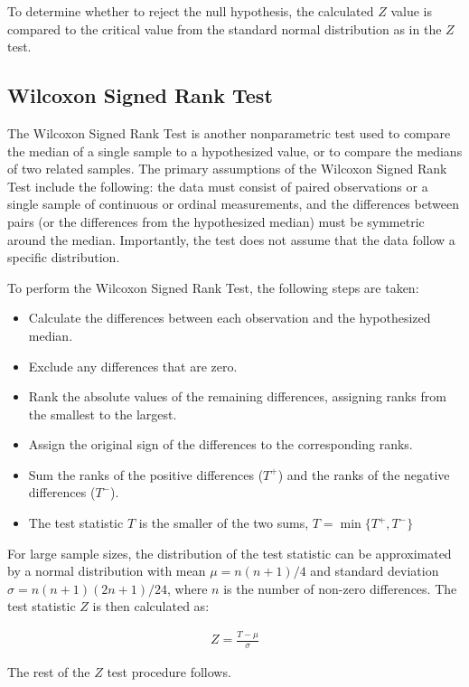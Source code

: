 \documentclass{article}
\begin{document}
To determine whether to reject the null hypothesis, the calculated $Z$ value is compared to the critical value from the standard normal distribution as in the $Z$ test. 

\subsection{Wilcoxon Signed Rank Test}

The Wilcoxon Signed Rank Test is another nonparametric  test used to compare the median of a single sample to a hypothesized value, or to compare the medians of two related samples. The primary assumptions of the Wilcoxon Signed Rank Test include the following: the data must consist of paired observations or a single sample of continuous or ordinal measurements, and the differences between pairs (or the differences from the hypothesized median) must be symmetric around the median. Importantly, the test does not assume that the data follow a specific distribution.

To perform the Wilcoxon Signed Rank Test, the following steps are taken:

\begin{itemize}
\item Calculate the differences between each observation and the hypothesized median.
\item Exclude any differences that are zero.
\item Rank the absolute values of the remaining differences, assigning ranks from the smallest to the largest.
\item Assign the original sign of the differences to the corresponding ranks.
\item Sum the ranks of the positive differences ($T^{+}$) and the ranks of the negative differences ($T^{-}$).
\item The test statistic $T$ is the smaller of the two sums, $T = \min\{T^{+}, T^{-}\}$
\end{itemize}

For large sample sizes, the distribution of the test statistic can be approximated by a normal distribution with mean $\mu = n(n+1)/4$ and standard deviation $\sigma = n(n+1)(2n+1)/24$, where $n$ is the number of non-zero differences. The test  statistic $Z$ is then calculated as:

\begin{align*}
    Z = \frac{T - \mu}{\sigma}
\end{align*}

The rest of the $Z$ test procedure follows.
\end{document}
